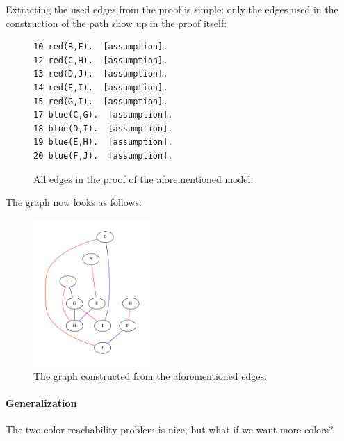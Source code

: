 \documentclass[12pt]{article}
\begin{document}
Extracting the used edges from the proof is simple:
only the edges used in the construction of the path show up in the proof itself:
\begin{figure}[h!]
	\begin{center}
		\begin{lstlisting}[frame=single]
10 red(B,F).  [assumption].
12 red(C,H).  [assumption].
13 red(D,J).  [assumption].
14 red(E,I).  [assumption].
15 red(G,I).  [assumption].
17 blue(C,G).  [assumption].
18 blue(D,I).  [assumption].
19 blue(E,H).  [assumption].
20 blue(F,J).  [assumption].
		\end{lstlisting}
	\end{center}
	\caption{All edges in the proof of the aforementioned model.}
\end{figure}
The graph now looks as follows:
\begin{figure}[h!]
	\begin{center}
		\includegraphics[width=0.4\textwidth]{graph-fixed.pdf}
	\end{center}
	\caption{The graph constructed from the aforementioned edges.}
\end{figure}

\paragraph{Generalization}
The two-color reachability problem is nice, but what if we want more colors?
\end{document}
